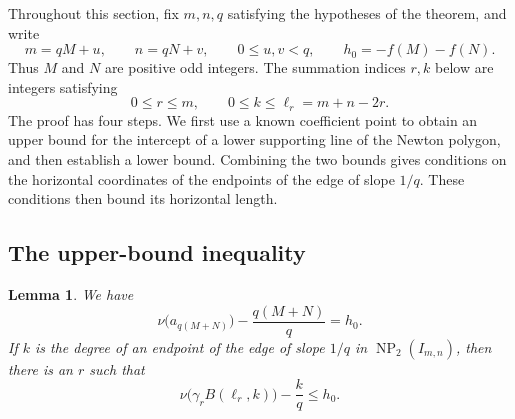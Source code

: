 \documentclass[11pt,a4paper]{article}
\numberwithin{equation}{section}
\newtheorem{lemma}[theorem]{Lemma}
\theoremstyle{definition}
\begin{document}
Throughout this section, fix $m,n,q$ satisfying the hypotheses of the theorem, and write
\begin{equation}
m=qM+u,\qquad n=qN+v,\qquad 0\le u,v<q,\qquad h_0=-f(M)-f(N).
\label{eq:3-2}
\end{equation}
Thus $M$ and $N$ are positive odd integers. The summation indices $r,k$ below are integers satisfying
\begin{equation}
0\le r\le m,\qquad 0\le k\le\ell_r=m+n-2r.
\label{eq:3-3}
\end{equation}
The proof has four steps. We first use a known coefficient point to obtain an upper bound for the intercept of a lower supporting line of the Newton polygon, and then establish a lower bound. Combining the two bounds gives conditions on the horizontal coordinates of the endpoints of the edge of slope $1/q$. These conditions then bound its horizontal length.

\subsection{The upper-bound inequality}

\begin{lemma}\label{lem:3-2}
We have
\begin{equation}
\nu\bigl(a_{q(M+N)}\bigr)-\frac{q(M+N)}{q}=h_0.
\label{eq:3-4}
\end{equation}
If $k$ is the degree of an endpoint of the edge of slope $1/q$ in $\operatorname{NP}_2(I_{m,n})$, then there is an $r$ such that
\begin{equation}
\nu\bigl(\gamma_r B(\ell_r,k)\bigr)-\frac{k}{q}\le h_0.
\label{eq:3-5}
\end{equation}
\end{lemma}
\end{document}
